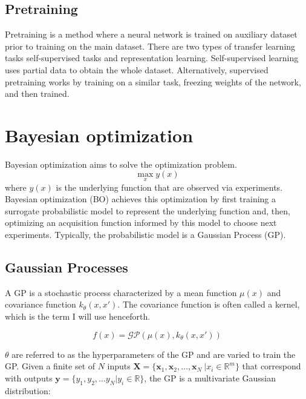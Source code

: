 \subsection{Pretraining}

Pretraining is a method where a neural network is trained on auxiliary dataset prior to training on the main dataset. There are two types of transfer learning tasks self-supervised tasks and representation learning. Self-supervised learning uses partial data to obtain the whole dataset. Alternatively,  supervised pretraining works by training on a similar task, freezing weights of the network, and then trained.

\section{Bayesian optimization}

Bayesian optimization aims to solve the optimization problem.
\begin{equation}
    \max_x y(x)
\end{equation}
where $y(x)$ is the underlying function that are observed via experiments. Bayesian optimization (BO) achieves this optimization by first training a surrogate probabilistic model to represent the underlying function and, then, optimizing an acquisition function informed by this model to choose next experiments. Typically,  the probabilistic model is a Gaussian Process (GP). 

\subsection{Gaussian Processes}

A GP is a stochastic process characterized by a mean function $\mu(x)$ and covariance function $k_{\theta}(x,x')$.\cite{Rasmussen2006} The covariance function is often called a kernel, which is the term I will use henceforth.

\begin{equation}
    f(x)= \mathcal{GP}(\mu(x), k_{\theta}(x, x'))
\end{equation}

$\theta$ are referred to as the hyperparameters of the GP and are varied to train the GP. Given a finite set of $N$ inputs $\mathbf X = \{\mathbf x_1, \mathbf x_2, \dots, \mathbf x_N \ \vert x_i \in \mathbb R^m \}$ that correspond with outputs $\mathbf y = \{y_1, y_2, \dots y_N \vert  y_i \in \mathbb R \}$, the GP is a multivariate Gaussian distribution:

